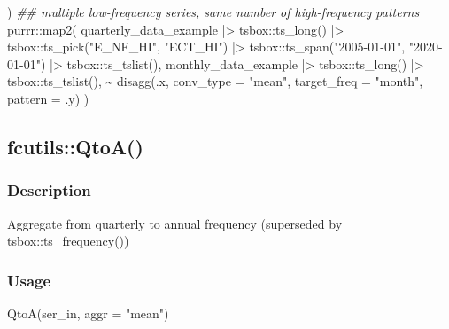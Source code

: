 \documentclass[
  letterpaper,
  DIV=11,
  numbers=noendperiod]{scrreport}
\newenvironment{Shaded}{\begin{snugshade}}{\end{snugshade}}
\newcommand{\AttributeTok}[1]{\textcolor[rgb]{0.40,0.45,0.13}{#1}}
\newcommand{\DocumentationTok}[1]{\textcolor[rgb]{0.37,0.37,0.37}{\textit{#1}}}
\newcommand{\FunctionTok}[1]{\textcolor[rgb]{0.28,0.35,0.67}{#1}}
\newcommand{\NormalTok}[1]{\textcolor[rgb]{0.00,0.23,0.31}{#1}}
\newcommand{\SpecialCharTok}[1]{\textcolor[rgb]{0.37,0.37,0.37}{#1}}
\newcommand{\StringTok}[1]{\textcolor[rgb]{0.13,0.47,0.30}{#1}}
\begin{document}
\begin{Shaded}
\begin{Highlighting}[]
\NormalTok{  )}
\DocumentationTok{\#\# multiple low{-}frequency series, same number of high{-}frequency patterns}
\NormalTok{purrr}\SpecialCharTok{::}\FunctionTok{map2}\NormalTok{(}
\NormalTok{  quarterly\_data\_example }\SpecialCharTok{|\textgreater{}}
\NormalTok{    tsbox}\SpecialCharTok{::}\FunctionTok{ts\_long}\NormalTok{() }\SpecialCharTok{|\textgreater{}}
\NormalTok{    tsbox}\SpecialCharTok{::}\FunctionTok{ts\_pick}\NormalTok{(}\StringTok{"E\_NF\_HI"}\NormalTok{, }\StringTok{"ECT\_HI"}\NormalTok{) }\SpecialCharTok{|\textgreater{}}
\NormalTok{    tsbox}\SpecialCharTok{::}\FunctionTok{ts\_span}\NormalTok{(}\StringTok{"2005{-}01{-}01"}\NormalTok{, }\StringTok{"2020{-}01{-}01"}\NormalTok{) }\SpecialCharTok{|\textgreater{}}
\NormalTok{    tsbox}\SpecialCharTok{::}\FunctionTok{ts\_tslist}\NormalTok{(),}
\NormalTok{  monthly\_data\_example }\SpecialCharTok{|\textgreater{}}
\NormalTok{    tsbox}\SpecialCharTok{::}\FunctionTok{ts\_long}\NormalTok{() }\SpecialCharTok{|\textgreater{}}
\NormalTok{    tsbox}\SpecialCharTok{::}\FunctionTok{ts\_tslist}\NormalTok{(),}
  \SpecialCharTok{\textasciitilde{}} \FunctionTok{disagg}\NormalTok{(.x, }\AttributeTok{conv\_type =} \StringTok{"mean"}\NormalTok{, }\AttributeTok{target\_freq =} \StringTok{"month"}\NormalTok{, }\AttributeTok{pattern =}\NormalTok{ .y)}
\NormalTok{)}
\end{Highlighting}
\end{Shaded}

\subsection{fcutils::QtoA()}\label{fcutilsqtoa}

\subsubsection{Description}\label{description-27}

Aggregate from quarterly to annual frequency (superseded by
tsbox::ts\_frequency())

\subsubsection{Usage}\label{usage-27}

\begin{Shaded}
\begin{Highlighting}[]
\FunctionTok{QtoA}\NormalTok{(ser\_in, }\AttributeTok{aggr =} \StringTok{"mean"}\NormalTok{)}
\end{Highlighting}
\end{Shaded}
\end{document}
